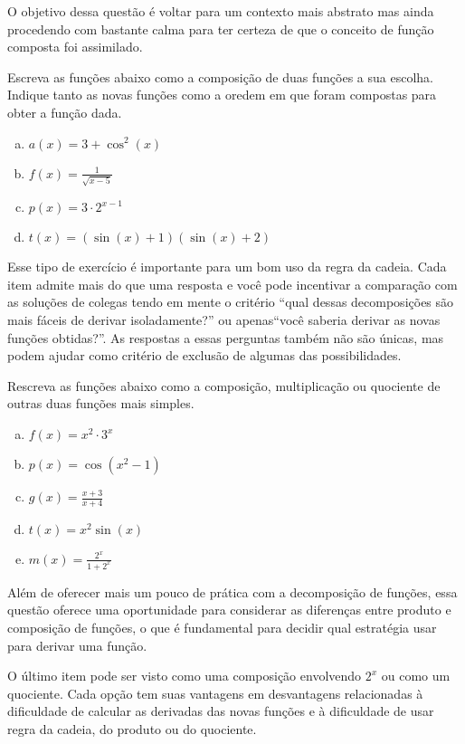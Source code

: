 \documentclass[main_estudante.tex]{subfiles}
\begin{document}
O objetivo dessa questão é voltar para um contexto mais abstrato mas ainda procedendo com bastante calma para ter certeza de que o conceito de função composta foi assimilado.

\begin{questao}
Escreva as funções abaixo como a composição de duas funções a sua escolha. Indique tanto as novas funções como a oredem em que foram compostas para obter a função dada.
\begin{enumerate}[a)]
\item $a(x)=3+\cos^2(x)$
\item $f(x)=\frac{1}{\sqrt{x-5}}$
\item $p(x)=3 \cdot 2^{x-1}$
\item $t(x)=(\sin(x)+1)(\sin(x)+2)$
\end{enumerate}
\end{questao}

Esse tipo de exercício é importante para um bom uso da regra da cadeia. Cada item admite mais do que uma resposta e você pode incentivar a comparação com as soluções de colegas tendo em mente o critério ``qual dessas decomposições são mais fáceis de derivar isoladamente?'' ou apenas``você saberia derivar as novas funções obtidas?''. As respostas a essas perguntas também não são únicas, mas podem ajudar como critério de exclusão de algumas das possibilidades.

\begin{questao}
Rescreva as funções abaixo como a composição, multiplicação ou quociente de outras duas funções mais simples.
\begin{enumerate}[a)]
\item $f(x)=x^2 \cdot 3^x$
\item $p(x)=\cos(x^2-1)$
\item $g(x)=\frac{x+3}{x+4}$
\item $t(x)=x^2\sin(x)$
\item $m(x)=\frac{2^x}{1+2^x}$
\end{enumerate}
\end{questao}

Além de oferecer mais um pouco de prática com a decomposição de funções, essa questão oferece uma oportunidade para considerar as diferenças entre produto e composição de funções, o que é fundamental para decidir qual estratégia usar para derivar uma função.

O último item pode ser visto como uma composição envolvendo $2^x$ ou como um quociente. Cada opção tem suas vantagens em desvantagens relacionadas à dificuldade de calcular as derivadas das novas funções e à dificuldade de usar regra da cadeia, do produto ou do quociente.
\end{document}
